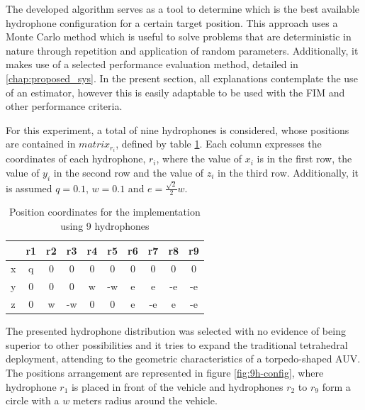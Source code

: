 The developed algorithm serves as a tool to determine which is the best available hydrophone configuration for a certain target position. This approach uses a Monte Carlo method which is useful to solve problems that are deterministic in nature through repetition and application of random parameters. Additionally, it makes use of a selected performance evaluation method, detailed in \ref{chap:proposed_sys}. In the present section, all explanations contemplate the use of an estimator, however this is easily adaptable to be used with the FIM and other performance criteria.
		
For this experiment, a total of nine hydrophones is considered, whose positions are contained in $matrix_{r_{i}}$, defined by table \ref{tab:config-9h}. Each column expresses the coordinates of each hydrophone, $r_i$, where the value of $x_i$ is in the first row, the value of $y_i$ in the second row and the value of $z_i$ in the third row. Additionally, it is assumed $q = 0.1$, $w = 0.1$ and $e = \frac{ \sqrt{2}}{2} w$.

\begin{table}[!htbp] %
	\begin{center}
		\begin{tabular}{c | c c c c c c c c c}
			\toprule
			& r1 & r2 & r3 & r4	& r5 & r6 & r7 & r8	& r9 \\ \hline 
			\multirow{1}{0.5em}{x} 
			& q & 0 & 0 & 0 & 0 & 0 & 0 & 0 & 0\\
			\midrule 
			\multirow{1}{0.5em}{y} 
			& 0 & 0 & 0 & w & -w & e & e & -e & -e\\
			\midrule 
			\multirow{1}{0.5em}{z} 
			& 0 & w & -w & 0 & 0 & e & -e & e & -e \\
			\bottomrule 
		\end{tabular}
		\caption{Position coordinates for the implementation using 9 hydrophones}
		\label{tab:config-9h}
	\end{center}
\end{table}

The presented hydrophone distribution was selected with no evidence of being superior to other possibilities and it tries to expand the traditional tetrahedral deployment, attending to the geometric characteristics of a torpedo-shaped AUV. The positions arrangement are represented in figure \ref{fig:9h-config}, where hydrophone $r_1$ is placed in front of the vehicle and hydrophones $r_2$ to $r_9$ form a circle with a $w$ meters radius around the vehicle.

